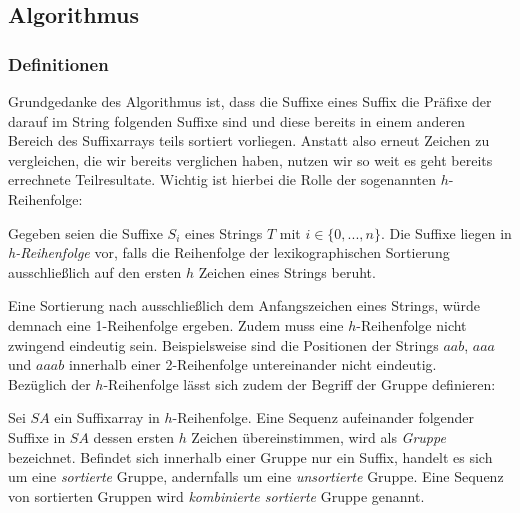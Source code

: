 \subsection{Algorithmus}
\subsubsection{Definitionen}
Grundgedanke des Algorithmus ist, dass die Suffixe eines Suffix die Präfixe der darauf im String folgenden Suffixe sind und diese bereits in einem anderen Bereich des Suffixarrays teils sortiert vorliegen. Anstatt also erneut Zeichen zu vergleichen, die wir bereits verglichen haben, nutzen wir so weit es geht bereits errechnete Teilresultate.
Wichtig ist hierbei die Rolle der sogenannten $h$-Reihenfolge:
\begin{definition}[$h$-Reihenfolge]
Gegeben seien die Suffixe $S_i$ eines Strings $T$ mit $i \in \{0,...,n\}$. Die Suffixe liegen in \textit{h-Reihenfolge} vor, falls die Reihenfolge der lexikographischen Sortierung ausschließlich auf den ersten $h$ Zeichen eines Strings beruht. 
\end{definition}
Eine Sortierung nach ausschließlich dem Anfangszeichen eines Strings, würde demnach eine 1-Reihenfolge ergeben. Zudem muss eine $h$-Reihenfolge nicht zwingend eindeutig sein. Beispielsweise sind die Positionen der Strings $aab$, $aaa$ und $aaab$ innerhalb einer 2-Reihenfolge untereinander nicht eindeutig. \\
Bezüglich der $h$-Reihenfolge lässt sich zudem der Begriff der Gruppe definieren:
\begin{definition}[Gruppe]
Sei $SA$ ein Suffixarray in $h$-Reihenfolge. Eine Sequenz aufeinander folgender Suffixe in $SA$ dessen ersten $h$ Zeichen übereinstimmen, wird als \textit{Gruppe} bezeichnet. Befindet sich innerhalb einer Gruppe nur ein Suffix, handelt es sich um eine \textit{sortierte} Gruppe, andernfalls um eine \textit{unsortierte} Gruppe. 
Eine Sequenz von sortierten Gruppen wird \textit{kombinierte sortierte} Gruppe genannt.
\end{definition}


